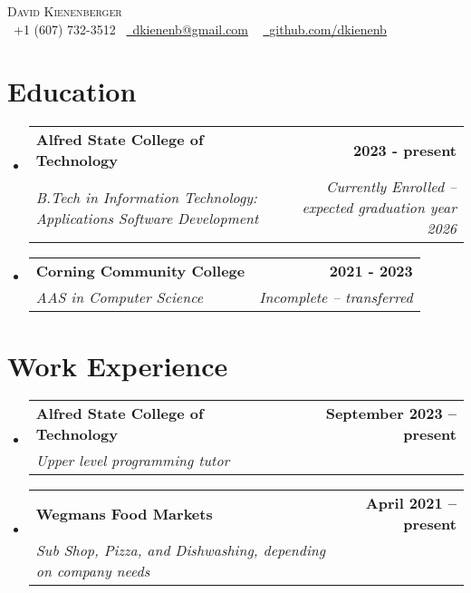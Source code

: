 \documentclass[letterpaper,11pt]{article}
\makeatletter
\newcommand{\resumeSubheading}[4]{
  \vspace{-2pt}\item
    \begin{tabular*}{1.0\textwidth}[t]{l@{\extracolsep{\fill}}r}
      \textbf{#1} & \textbf{\small #2} \\
      \textit{\small#3} & \textit{\small #4} \\
    \end{tabular*}\vspace{-7pt}
}
\newcommand{\resumeSubHeadingListStart}{\begin{itemize}[leftmargin=0.0in, label={}]}
\newcommand{\resumeSubHeadingListEnd}{\end{itemize}}
\makeatother
\begin{document}
\begin{center}
  {\Huge \scshape David Kienenberger} \\ \vspace{5pt}
  \small \raisebox{-0.1\height}\faPhone\ +1 (607) 732-3512~ \href{mailto:dkienenb@gmail.com}{\raisebox{-0.2\height}\faEnvelope\  \underline{dkienenb@gmail.com}} ~
  \href{https://github.com/dkienenb}{\raisebox{-0.2\height}\faGithub\ \underline{github.com/dkienenb}}
  \vspace{-8pt}
\end{center}

\vspace{-10pt}
\section{Education}
\resumeSubHeadingListStart
\resumeSubheading
{Alfred State College of Technology}{2023 - present}{B.Tech in Information Technology: Applications Software Development}{Currently Enrolled -- expected graduation year 2026}
\resumeSubheading
{Corning Community College}{2021 - 2023}{AAS in Computer Science}{Incomplete -- transferred}
\resumeSubHeadingListEnd
\vspace{-10pt}



\section{Work Experience}
\resumeSubHeadingListStart

\resumeSubheading
{Alfred State College of Technology}{September 2023 -- present}
{Upper level programming tutor}{}
\resumeSubheading
{Wegmans Food Markets}{April 2021 -- present}
{Sub Shop, Pizza, and Dishwashing, depending on company needs}{}
\resumeSubHeadingListEnd
\vspace{-10pt}
\end{document}
